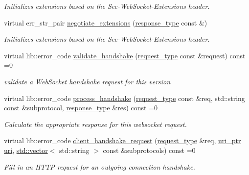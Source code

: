 \begin{DoxyCompactItemize}
\begin{DoxyCompactList}\small\item\em Initializes extensions based on the Sec-\/\+Web\+Socket-\/\+Extensions header. \end{DoxyCompactList}\item 
virtual err\+\_\+str\+\_\+pair \mbox{\hyperlink{classwebsocketpp_1_1processor_1_1processor_a236ab7829e607fa58cc94c219a1a680c}{negotiate\+\_\+extensions}} (\mbox{\hyperlink{classwebsocketpp_1_1http_1_1parser_1_1response}{response\+\_\+type}} const \&)
\begin{DoxyCompactList}\small\item\em Initializes extensions based on the Sec-\/\+Web\+Socket-\/\+Extensions header. \end{DoxyCompactList}\item 
virtual lib\+::error\+\_\+code \mbox{\hyperlink{classwebsocketpp_1_1processor_1_1processor_a8828f7d91c534309deb966b783eb1f8e}{validate\+\_\+handshake}} (\mbox{\hyperlink{classwebsocketpp_1_1http_1_1parser_1_1request}{request\+\_\+type}} const \&request) const =0
\begin{DoxyCompactList}\small\item\em validate a Web\+Socket handshake request for this version \end{DoxyCompactList}\item 
virtual lib\+::error\+\_\+code \mbox{\hyperlink{classwebsocketpp_1_1processor_1_1processor_a64caf3ebac5333112f48eec496ec2a47}{process\+\_\+handshake}} (\mbox{\hyperlink{classwebsocketpp_1_1http_1_1parser_1_1request}{request\+\_\+type}} const \&req, std\+::string const \&subprotocol, \mbox{\hyperlink{classwebsocketpp_1_1http_1_1parser_1_1response}{response\+\_\+type}} \&res) const =0
\begin{DoxyCompactList}\small\item\em Calculate the appropriate response for this websocket request. \end{DoxyCompactList}\item 
virtual lib\+::error\+\_\+code \mbox{\hyperlink{classwebsocketpp_1_1processor_1_1processor_ab5bc7b8f480ee28049f44232115bcaab}{client\+\_\+handshake\+\_\+request}} (\mbox{\hyperlink{classwebsocketpp_1_1http_1_1parser_1_1request}{request\+\_\+type}} \&req, \mbox{\hyperlink{namespacewebsocketpp_aae370ea5ac83a8ece7712cb39fc23f5b}{uri\+\_\+ptr}} \mbox{\hyperlink{classwebsocketpp_1_1uri}{uri}}, \mbox{\hyperlink{classstd_1_1vector}{std\+::vector}}$<$ std\+::string $>$ const \&subprotocols) const =0
\begin{DoxyCompactList}\small\item\em Fill in an H\+T\+TP request for an outgoing connection handshake. \end{DoxyCompactList}\item 

\end{DoxyCompactItemize}
